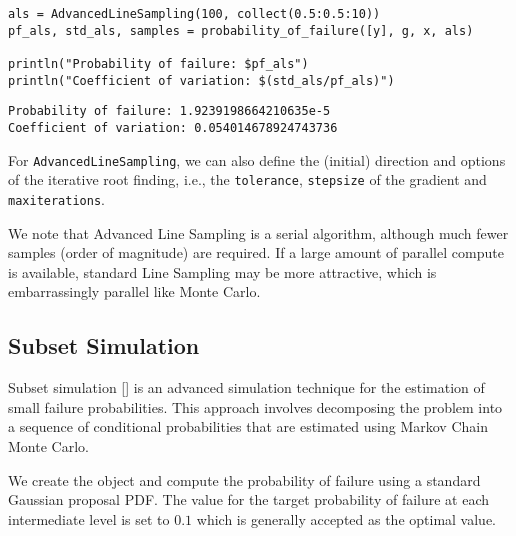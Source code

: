 \begin{verbatim}
als = AdvancedLineSampling(100, collect(0.5:0.5:10))
pf_als, std_als, samples = probability_of_failure([y], g, x, als)

println("Probability of failure: $pf_als")
println("Coefficient of variation: $(std_als/pf_als)")
\end{verbatim}


\begin{verbatim}
Probability of failure: 1.9239198664210635e-5
Coefficient of variation: 0.054014678924743736
\end{verbatim}



For \texttt{AdvancedLineSampling}, we can also define the (initial) direction and options of the iterative root finding, i.e., the \texttt{tolerance}, \texttt{stepsize} of the gradient and \texttt{maxiterations}.



\begin{tcolorbox}[toptitle=-1mm,bottomtitle=1mm,colback=admonition-note!50!white,colframe=admonition-note,title=\textbf{Parallelism}]
We note that Advanced Line Sampling is a serial algorithm, although much fewer samples (order of magnitude) are required. If a large amount of parallel compute is available, standard Line Sampling may be more attractive, which is {\textquotedbl}embarrassingly{\textquotedbl} parallel like Monte Carlo.

\end{tcolorbox}


\subsection{Subset Simulation}



\label{336527219531960381}{}


Subset simulation [] is an advanced simulation technique for the estimation of small failure probabilities. This approach involves decomposing the problem into a sequence of conditional probabilities that are estimated using Markov Chain Monte Carlo.



We create the  object and compute the probability of failure using a standard Gaussian proposal PDF. The value for the target probability of failure at each intermediate level is set to \(0.1\) which is generally accepted as the optimal value.




